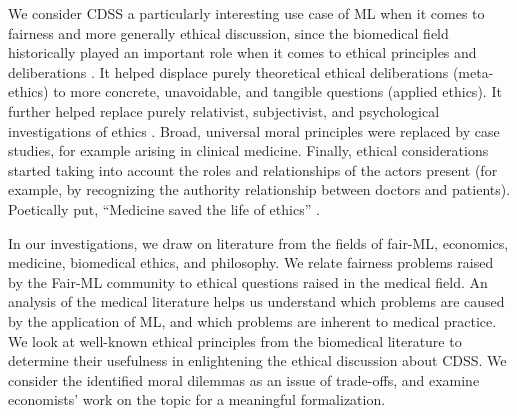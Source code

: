We consider CDSS a particularly interesting use case of ML when it comes to fairness and more generally ethical discussion, since the biomedical field historically played an important role when it comes to ethical principles and deliberations \cite{Toulmin1982}\cite{Hardin1989}.
It helped displace purely theoretical ethical deliberations (meta-ethics) to more concrete, unavoidable, and tangible questions (applied ethics).
It further helped replace purely relativist, subjectivist, and psychological investigations of ethics \cite{Toulmin1982}.
Broad, universal moral principles were replaced by case studies, for example arising in clinical medicine.
Finally, ethical considerations started taking into account the roles and relationships of the actors present (for example, by recognizing the authority relationship between doctors and patients).
Poetically put, ``Medicine saved the life of ethics'' \cite{Toulmin1982}.


In our investigations, we draw on literature from the fields of fair-ML, economics, medicine, biomedical ethics, and philosophy.
We relate fairness problems raised by the Fair-ML community to ethical questions raised in the medical field.
An analysis of the medical literature helps us understand which problems are caused by the application of ML, and which problems are inherent to medical practice.
We look at well-known ethical principles from the biomedical literature to determine their usefulness in enlightening the ethical discussion about CDSS.
We consider the identified moral dilemmas as an issue of trade-offs, and examine economists' work on the topic for a meaningful formalization.
